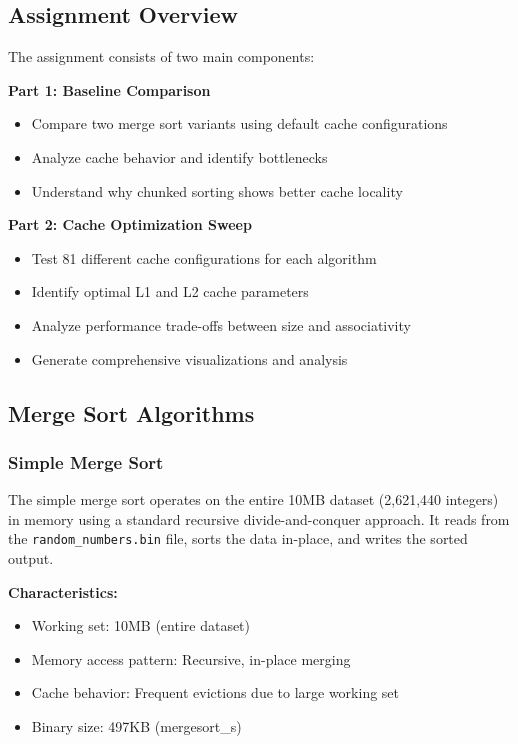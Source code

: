 \documentclass[12pt,a4paper]{article}
\begin{document}
\subsection{Assignment Overview}

The assignment consists of two main components:

\textbf{Part 1: Baseline Comparison}
\begin{itemize}
    \item Compare two merge sort variants using default cache configurations
    \item Analyze cache behavior and identify bottlenecks
    \item Understand why chunked sorting shows better cache locality
\end{itemize}

\textbf{Part 2: Cache Optimization Sweep}
\begin{itemize}
    \item Test 81 different cache configurations for each algorithm
    \item Identify optimal L1 and L2 cache parameters
    \item Analyze performance trade-offs between size and associativity
    \item Generate comprehensive visualizations and analysis
\end{itemize}

\subsection{Merge Sort Algorithms}

\subsubsection{Simple Merge Sort}

The simple merge sort operates on the entire 10MB dataset (2,621,440 integers) in memory using a standard recursive divide-and-conquer approach. It reads from the \texttt{random\_numbers.bin} file, sorts the data in-place, and writes the sorted output.

\textbf{Characteristics:}
\begin{itemize}
    \item Working set: 10MB (entire dataset)
    \item Memory access pattern: Recursive, in-place merging
    \item Cache behavior: Frequent evictions due to large working set
    \item Binary size: 497KB (mergesort\_s)
\end{itemize}
\end{document}
